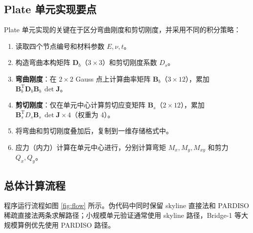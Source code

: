\documentclass[UTF8,a4paper,zihao=-4]{ctexart}
\newcommand{\T}{\mathrm{T}}
\newcommand{\Dmat}{\bm{D}}
\newcommand{\Bmat}{\bm{B}}
\begin{document}
\subsection{Plate 单元实现要点}

Plate 单元实现的关键在于区分弯曲刚度和剪切刚度，并采用不同的积分策略：

\begin{enumerate}
    \item 读取四个节点编号和材料参数 $E,\nu,t$。
    \item 构造弯曲本构矩阵 $\Dmat_b$（$3\times3$）和剪切刚度系数 $D_s$。
    \item \textbf{弯曲刚度}：在 $2\times2$ Gauss 点上计算曲率矩阵 $\Bmat_b$（$3\times12$），累加 $\Bmat_b^{\T}\Dmat_b\Bmat_b\,\det\bm{J}$。
    \item \textbf{剪切刚度}：仅在单元中心计算剪切应变矩阵 $\Bmat_s$（$2\times12$），累加 $\Bmat_s^{\T}D_s\Bmat_s\,\det\bm{J}\times4$（权重为 4）。
    \item 将弯曲和剪切刚度叠加后，复制到一维存储格式中。
    \item 应力（内力）计算在单元中心进行，分别计算弯矩 $M_x,M_y,M_{xy}$ 和剪力 $Q_x,Q_y$。
\end{enumerate}

\subsection{总体计算流程}

程序运行流程如图 \ref{fig:flow} 所示。伪代码中同时保留 skyline 直接法和 PARDISO 稀疏直接法两条求解路径；小规模单元验证通常使用 skyline 路径，Bridge-1 等大规模算例优先使用 PARDISO 路径。
\end{document}
